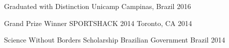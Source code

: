 



\begin{cvhonors}

  \cvhonor
    {Graduated with Distinction} %
    {Unicamp} %
    {Campinas, Brazil} %
    {2016} %

  \cvhonor
    {Grand Prize Winner} %
    {SPORTSHACK 2014} %
    {Toronto, CA} %
    {2014} %

  \cvhonor
    {Science Without Borders Scholarship} %
    {Brazilian Government} %
    {Brazil} %
    {2014} %

\end{cvhonors}